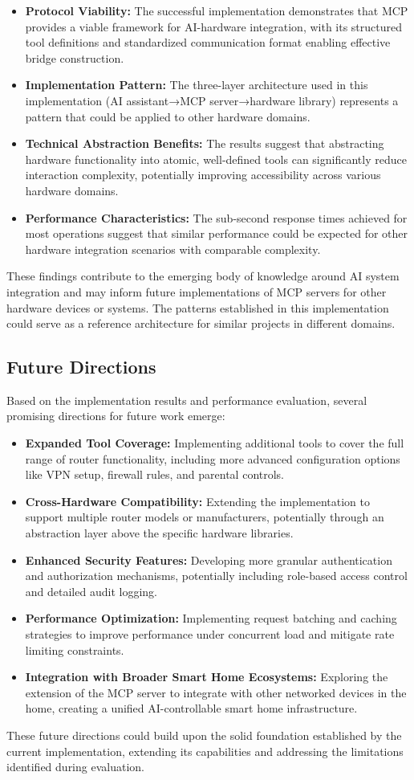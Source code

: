 \begin{itemize}
\item \textbf{Protocol Viability:} The successful implementation demonstrates that MCP provides a viable framework for AI-hardware integration, with its structured tool definitions and standardized communication format enabling effective bridge construction.
\item \textbf{Implementation Pattern:} The three-layer architecture used in this implementation (AI assistant→MCP server→hardware library) represents a pattern that could be applied to other hardware domains.
\item \textbf{Technical Abstraction Benefits:} The results suggest that abstracting hardware functionality into atomic, well-defined tools can significantly reduce interaction complexity, potentially improving accessibility across various hardware domains.
\item \textbf{Performance Characteristics:} The sub-second response times achieved for most operations suggest that similar performance could be expected for other hardware integration scenarios with comparable complexity.
\end{itemize}

These findings contribute to the emerging body of knowledge around AI system integration and may inform future implementations of MCP servers for other hardware devices or systems. The patterns established in this implementation could serve as a reference architecture for similar projects in different domains.

\subsection{Future Directions}
Based on the implementation results and performance evaluation, several promising directions for future work emerge:

\begin{itemize}
\item \textbf{Expanded Tool Coverage:} Implementing additional tools to cover the full range of router functionality, including more advanced configuration options like VPN setup, firewall rules, and parental controls.
\item \textbf{Cross-Hardware Compatibility:} Extending the implementation to support multiple router models or manufacturers, potentially through an abstraction layer above the specific hardware libraries.
\item \textbf{Enhanced Security Features:} Developing more granular authentication and authorization mechanisms, potentially including role-based access control and detailed audit logging.
\item \textbf{Performance Optimization:} Implementing request batching and caching strategies to improve performance under concurrent load and mitigate rate limiting constraints.
\item \textbf{Integration with Broader Smart Home Ecosystems:} Exploring the extension of the MCP server to integrate with other networked devices in the home, creating a unified AI-controllable smart home infrastructure.
\end{itemize}

These future directions could build upon the solid foundation established by the current implementation, extending its capabilities and addressing the limitations identified during evaluation.


